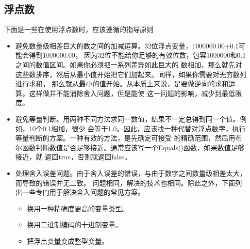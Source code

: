 \documentclass{article}
\begin{document}
\subsection{浮点数}
下面是一些在使用浮点数时，应该遵循的指导原则
\begin{itemize}
    \item 避免数量级相差巨大的数之间的加减运算。32位浮点变量，1000000.00+0.1可能会得到1000000.00，
    因为32位不能给你足够的有效位数，包容1000000和0.1之间的数值区间。如果你必须把一系列差异如此巨大的
    数相加，那么就先对这些数排序，然后从最小值开始把它们加起来。同样，如果你需要对无穷数列进行求和，
    那么就从最小的值开始。从本质上来说，是要做逆向的求和运算。这样做并不能消除舍入问题，但是能使
    这一问题的影响，减少到最低限度。
    \item 避免等量判断。用两种不同方法求同一数值，结果不一定总得到同一个值。例如，10个0.1相加，很少
    会等于1.0。因此，应该找一种代替对浮点数字，执行等量判断的方案。一种有效的方法，是先确定可接受
    的精确范围，然后用布尔函数判断数值是否足够接近。通常应该写一个Equals()函数，如果数值足够接近，就
    返回true，否则就返回false。
    \item 处理舍入误差问题。由于舍入误差的错误，与由于数字之间数量级相差太大，而导致的错误并无二致。
    问题相同，解决的技术也相同。除此之外，下面列出一些专门用于解决舍入问题的常见方案。
    \begin{itemize}
        \item 换用一种精确度更高的变量类型。
        \item 换用二进制编码的十进制变量。
        \item 把浮点变量变成整型变量。
    \end{itemize}
\end{itemize}
\end{document}
